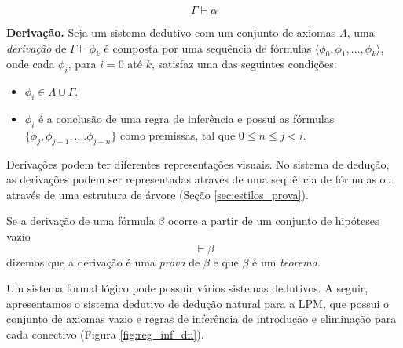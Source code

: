 $$\Gamma \vdash \alpha$$

\begin{definition}{\textbf{Derivação.}}
Seja um sistema dedutivo com um conjunto de axiomas $\Lambda$, uma \textit{derivação} de $\Gamma \vdash \phi_k$ é composta por uma sequência de fórmulas $\langle \phi_0, \phi_1, ..., \phi_k\rangle$, onde cada $\phi_i$, para $i = 0$ até $k$, satisfaz uma das seguintes condições:

\begin{itemize}
    \item $\phi_i \in \Lambda \cup \Gamma$.
    \item $\phi_i$ é a conclusão de uma regra de inferência e possui as fórmulas $\{\phi_j, \phi_{j-1}, .... \phi_{j-n}\}$ como premissas, tal que $0 \leq n \leq j < i$.
\end{itemize}
\end{definition}

Derivações podem ter diferentes representações visuais. No sistema de dedução, as derivações podem ser representadas através de uma sequência de fórmulas ou através de uma estrutura de árvore (Seção \ref{sec:estilos_prova}).

Se a derivação de uma fórmula $\beta$ ocorre a partir de um conjunto de hipóteses vazio $$\vdash \beta$$ dizemos que a derivação é uma \textit{prova} de $\beta$ e que $\beta$ é um \textit{teorema}.

Um sistema formal lógico pode possuir vários sistemas dedutivos. A seguir, apresentamos o sistema dedutivo de dedução natural para a LPM, que possui o conjunto de axiomas vazio e regras de inferência de introdução e eliminação para cada conectivo (Figura \ref{fig:reg_inf_dn}).


